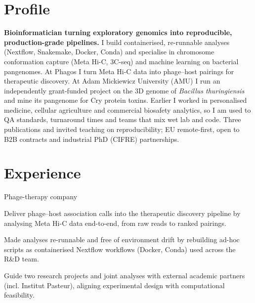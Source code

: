 \documentclass[]{deedy-resume-openfont}
\newcommand{\entrysep}{\vspace{6pt}}
\newcommand{\entrynote}[1]{{\footnotesize\color{headings}#1}\par}
\begin{document}
\resumephoto[21mm]{10mm}{4.5mm}

\raggedright


\section{Profile}
{\small
\textbf{Bioinformatician turning exploratory genomics into reproducible, production-grade pipelines.}
I build containerised, re-runnable analyses (Nextflow, Snakemake, Docker, Conda) and specialise in chromosome conformation capture (Meta Hi-C, 3C-seq) and machine learning on bacterial pangenomes.
At Phagos I turn Meta Hi-C data into phage--host pairings for therapeutic discovery.
At Adam Mickiewicz University (AMU) I run an independently grant-funded project on the 3D genome of \textit{Bacillus thuringiensis} and mine its pangenome for Cry protein toxins.
Earlier I worked in personalised medicine, cellular agriculture and commercial biosafety analytics, so I am used to QA standards, turnaround times and teams that mix wet lab and code.
Three publications and invited teaching on reproducibility; EU remote-first, open to B2B contracts and industrial PhD (CIFRE) partnerships.\par}


\section{Experience}

\entrynote{Phage-therapy company}
\begin{tightemize}
\item Deliver phage--host association calls into the therapeutic discovery pipeline by analysing Meta Hi-C data end-to-end, from raw reads to ranked pairings.
\item Made analyses re-runnable and free of environment drift by rebuilding ad-hoc scripts as containerised Nextflow workflows (Docker, Conda) used across the R\&D team.
\item Guide two research projects and joint analyses with external academic partners (incl. Institut Pasteur), aligning experimental design with computational feasibility.
\end{tightemize}
\entrysep
\end{document}
